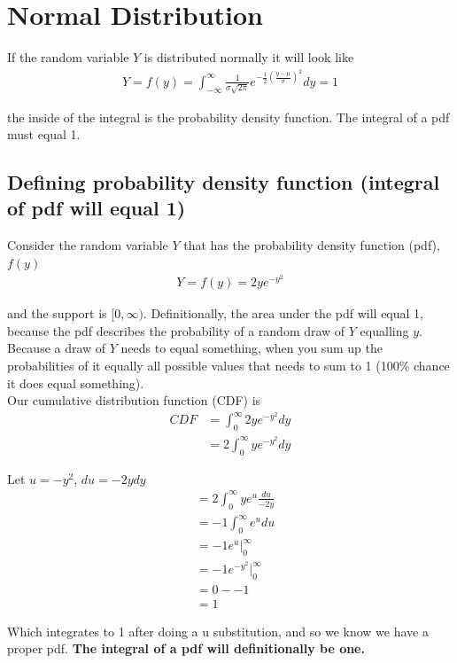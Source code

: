 \documentclass{article}
\begin{document}
\section{Normal Distribution}
If the random variable $Y$ is distributed normally it will look like 
\begin{align}
    Y = f(y) = \int_{- \infty}^{\infty} \frac{1}{\sigma \sqrt{2 \pi}} e^{-\frac{1}{2}(\frac{y - \mu}{\sigma})^2} dy = 1
\end{align}

the inside of the integral is the probability density function. The integral of a pdf must equal 1. 

\subsection{Defining probability density function (integral of pdf will equal 1)}
Consider the random variable $Y$ that has the probability density function (pdf), $f(y)$
\begin{align}
    Y = f(y) = 2y e^{-y^2} \label{pdf}
\end{align}

and the support is $[0, \infty )$. Definitionally, the area under the pdf will equal 1, because the pdf describes the probability of a random draw of $Y$ equalling $y$. Because a draw of $Y$ needs to equal something, when you sum up the probabilities of it equally all possible values that needs to sum to 1 (100\% chance it does equal something).  \\

Our cumulative distribution function (CDF) is 
\begin{align}
    CDF &= \int_0^\infty 2y e^{-y^2} dy \\
    &= 2 \int_0^\infty y e^{-y^2} dy
\end{align}

Let $u = -y^2$, $du = -2y dy$
\begin{align}
    &= 2 \int_0^\infty  ye^u \frac{du}{-2y} \\
    &= -1  \int_0^\infty e^u du \\
    &= -1 e^u \bigg |_0^\infty \\
    & = -1 e^{-y^2}\bigg |_0^\infty \label{pdf_int}\\ 
    & = 0 - - 1\\
    & = 1
\end{align}

Which integrates to 1 after doing a u substitution, and so we know we have a proper pdf. \textbf{The integral of a pdf will definitionally be one.}\\
\end{document}
